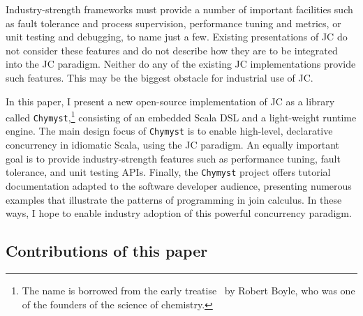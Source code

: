 \documentclass[sigplan,10pt]{acmart}\settopmatter{}
\begin{document}
Industry-strength frameworks must provide a number of important facilities
such as fault tolerance
and process supervision, performance tuning and metrics,
or unit testing and debugging, to name just a few. Existing
presentations of JC do not consider these features and do not describe
how they are to be integrated into the JC paradigm. Neither do any
of the existing JC implementations provide such features. This may
be the biggest obstacle for industrial use of JC.

In this paper, I present a new open-source implementation of JC as
a library called \texttt{Chymyst},\footnote{ The name is borrowed from the early treatise~\citep{Boy1661} by
Robert Boyle, who was one of the founders of the science of chemistry.} consisting of an embedded Scala DSL and a light-weight runtime engine.
The main design focus of \texttt{Chymyst} is to enable high-level,
declarative concurrency in idiomatic Scala, using the JC paradigm.
An equally important goal is to provide industry-strength features
such as performance tuning, fault tolerance, and unit testing APIs.
Finally, the \texttt{Chymyst} project offers tutorial documentation
adapted to the software developer audience, presenting numerous examples
that illustrate the patterns of programming in join calculus. In these
ways, I hope to enable industry adoption of this powerful concurrency
paradigm.

\subsection{Contributions of this paper}
\end{document}
